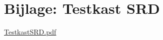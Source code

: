 \appendix

\section{Bijlage: Testkast SRD} \label{sec:TestKastSRD}

\href{run:TestkastSRD.pdf}{TestkastSRD.pdf}

